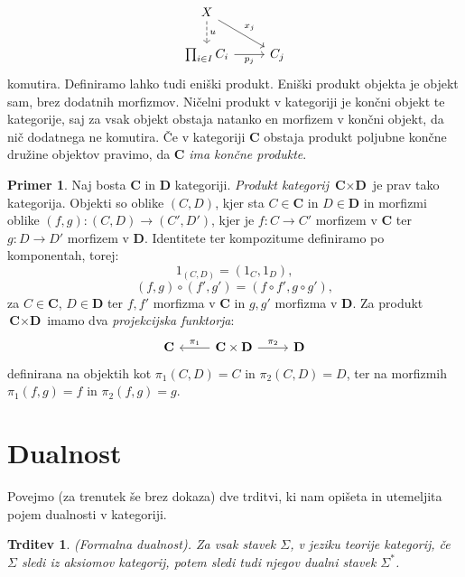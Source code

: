 \documentclass[12pt,a4paper]{book}
\theoremstyle{definition}
\theoremstyle{plain}
\newtheorem{trditev}[definicija]{Trditev}
\theoremstyle{definition}
\newtheorem{primer}{Primer}[section]
\theoremstyle{remark}
\newcommand{\cat}[1]{\textbf{#1}}
\begin{document}
$$\begin{tikzcd}
X \ar[d, dashed, "u"] \ar[dr, "x_j"] & \\
\prod_{i \in I}C_i \ar[r, "p_j"'] & C_j
\end{tikzcd}$$
komutira.
%
Definiramo lahko tudi eniški produkt. Eniški produkt objekta je objekt sam, brez dodatnih morfizmov. Ničelni produkt v kategoriji je končni objekt te kategorije, saj za vsak objekt obstaja natanko en morfizem v končni objekt, da nič dodatnega ne komutira. Če v kategoriji $\cat{C}$ obstaja produkt poljubne končne družine objektov pravimo, da $\cat{C}$ \emph{ima končne produkte}.
%
\begin{primer}
Naj bosta $\cat{C}$ in $\cat{D}$ kategoriji. \emph{Produkt kategorij} $\cat{C} \times \cat{D}$ je prav tako kategorija. Objekti so oblike $(C,D)$, kjer sta $C \in \cat{C}$ in $D \in \cat{D}$ in morfizmi oblike $(f,g) : (C,D) \to (C',D')$, kjer je $f : C \to C'$ morfizem v $\cat{C}$ ter $g : D \to D'$ morfizem v $\cat{D}$. Identitete ter kompozitume definiramo po komponentah, torej:
\begin{equation*}
1_{(C,D)} = (1_C,1_D),
\end{equation*}
\begin{equation*}
(f,g) \circ (f',g') = (f \circ f', g \circ g'),
\end{equation*}
za $C \in \cat{C}$, $D \in \cat{D}$ ter $f,f'$ morfizma v $\cat{C}$ in $g,g'$ morfizma v $\cat{D}$.
Za produkt $\cat{C} \times \cat{D}$ imamo dva \textit{projekcijska funktorja}:
\[
\begin{tikzcd}
\cat{C} & \arrow[l, "\pi_1"'] \cat{C} \times \cat{D} \arrow[r, "\pi_2"] & \cat{D}
\end{tikzcd}
\]
definirana na objektih kot $\pi_1(C,D) = C$ in $\pi_2(C,D) = D$, ter na morfizmih $\pi_1(f,g) = f$ in $\pi_2(f,g) = g$.
\end{primer}

\section{Dualnost}
Povejmo (za trenutek še brez dokaza) dve trditvi, ki nam opišeta in utemeljita pojem dualnosti v kategoriji.

\begin{trditev} \emph{(Formalna dualnost)}. 
Za vsak stavek $\Sigma$, v jeziku teorije kategorij, če $\Sigma$ sledi iz aksiomov kategorij, potem sledi tudi njegov dualni stavek $\Sigma^*$.
\end{trditev}
\end{document}
